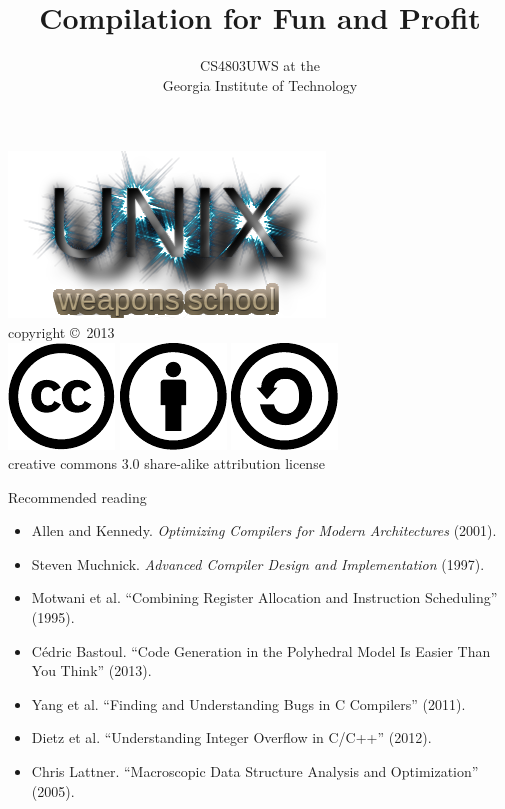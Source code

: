 \documentclass[mathserif,xcolor={dvipsnames,table}]{beamer}
\title{\textbf{Compilation for Fun and Profit}}
\date{}
\author{CS4803UWS at the\\
Georgia Institute of Technology
}
\begin{document}
\begin{frame}
\titlepage
\begin{center}
\includegraphics[scale=0.33]{images/uws.png}\\
\vspace{.1in}
\tiny{copyright \copyright\ 2013}\\
\includegraphics[scale=.25]{images/cc-logo.pdf}
\includegraphics[scale=.25]{images/cc-new.pdf}
\includegraphics[scale=.25]{images/cc-share.pdf}\\
\tiny{creative commons 3.0 share-alike attribution license}
\end{center}
\end{frame}

\begin{frame}{Recommended reading}
\tiny{
\begin{itemize}
\item Allen and Kennedy. \textit{Optimizing Compilers for Modern Architectures} (2001).
\item Steven Muchnick. \textit{Advanced Compiler Design and Implementation} (1997).
\item Motwani et al. ``Combining Register Allocation and Instruction Scheduling'' (1995).
\item C\'{e}dric Bastoul. ``Code Generation in the Polyhedral Model Is Easier Than You Think'' (2013).
\item Yang et al. ``Finding and Understanding Bugs in C Compilers'' (2011).
\item Dietz et al. ``Understanding Integer Overflow in C/C++'' (2012).
\item Chris Lattner. ``Macroscopic Data Structure Analysis and Optimization'' (2005).
\end{itemize}
}
\end{frame}
\end{document}
